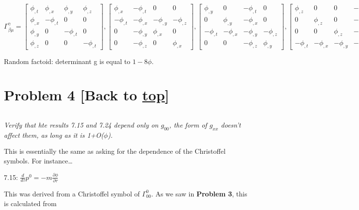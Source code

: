 \documentclass[landscape,letterpaper,10pt,english]{article}
\begin{document}
\[ \Gamma^{\gamma}_{\beta\mu} = \begin{bmatrix}
\phi_{,t} & \phi_{,x} & \phi_{,y} & \phi_{,z} \\ 
\phi_{,x} & -\phi_{,t} & 0 & 0 \\
\phi_{,y} & 0 & -\phi_{,t} & 0 \\
\phi_{,z} & 0 & 0 & -\phi_{,t}
\end{bmatrix},\begin{bmatrix}
\phi_{,x} & -\phi_{,t} & 0 & 0 \\ 
-\phi_{,t} & -\phi_{,x} & -\phi_{,y} & -\phi_{,z} \\
0 & -\phi_{,y} & \phi_{,x} & 0 \\
0 & -\phi_{,z} & 0 & \phi_{,x}
\end{bmatrix},\begin{bmatrix}
\phi_{,y} & 0 & -\phi_{,t} & 0 \\ 
0 & \phi_{,y} & -\phi_{,x} & 0 \\
-\phi_{,t} & -\phi_{,x} & -\phi_{,y} & -\phi_{,z} \\
0 & 0 & -\phi_{,z} & \phi_{,y}
\end{bmatrix},\begin{bmatrix}
\phi_{,z} & 0 & 0 & -\phi_{,t} \\ 
0 & \phi_{,z} & 0 & -\phi_{,x} \\
0 & 0 & \phi_{,z} & -\phi_{,y} \\
-\phi_{,t} & -\phi_{,x} & -\phi_{,y} & -\phi_{,z}
\end{bmatrix}
\]

    Random factoid: determinant g is equal to \(1-8\phi\).

    \hypertarget{problem-4-back-to-top}{%
\section{\texorpdfstring{Problem 4 {[}Back to
\hyperref[toc]{top}{]}}{Problem 4 {[}Back to {]}}}\label{problem-4-back-to-top}}

\[\label{P4}\]

\emph{Verify that hte results 7.15 and 7.24 depend only on \(g_{00}\),
the form of \(g_{xx}\) doesn't affect them, as long as it is
1+O(\(\phi\)).}

    This is essentially the same as asking for the dependence of the
Christoffel symbols. For instance\ldots{}

7.15: \(\frac{d}{d\tau} p^0 = -m \frac{\partial \phi}{\partial \tau}\)

This was derived from a Christoffel symbol of \(\Gamma^0_00\). As we saw
in \textbf{Problem 3}, this is calculated from
\end{document}
